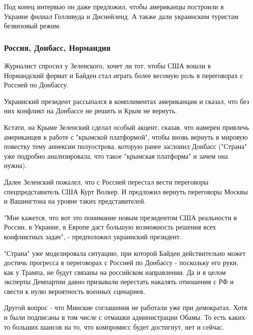 {Под конец интервью он даже предложил, чтобы американцы построили в Украине
филиал Голливуда и Диснейленд. А также дали украинским туристам безвизовый
режим. 

\subsubsection{Россия, Донбасс, Нормандия}

Журналист спросил у Зеленского, хочет ли тот, чтобы США вошли в Нормандский
формат и Байден стал играть более весомую роль в переговорах с Россией по
Донбассу. 

Украинский президент рассыпался в комплиментах американцам и сказал, что без
них конфликт на Донбассе не решить и Крым не вернуть.

Кстати, на Крыме Зеленский сделал особый акцент, сказав, что намерен привлечь
американцев к работе с "крымской платформой", чтобы вновь вернуть в мировую
повестку тему аннексии полуострова, которую ранее заслонил Донбасс ("Страна"
уже подробно анализировала, что такое "крымская платформа" и зачем она нужна). 

Далее Зеленский пожалел, что с Россией перестал вести переговоры
спецпредставитель США Курт Волкер. И предложил вернуть переговоры Москвы и
Вашингтона на уровне таких представителей. 

"Мне кажется, что вот это понимание новым президентом США реальности в России,
в Украине, в Европе даст большую возможность решения всех конфликтных задач", -
предположил украинский президент.

"Страна" уже моделировала ситуацию, при которой Байден действительно может
достичь прогресса в переговорах с Россией по Донбассу - поскольку его руки, как
у Трампа, не будут связаны на российском направлении. Да и в целом эксперты
Демпартии давно призывали перестать накалять отношения с РФ и свести к нулю
вероятность военных сценариев. 

Другой вопрос - что Минские соглашения не работали уже при демократах. Хотя и
были подписаны в том числе с отмашки администрации Обамы. То есть каких-то
больших шансов на то, что компромисс будет достигнут, нет и сейчас. 

}
